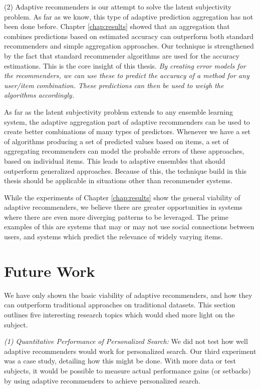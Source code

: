 (2) Adaptive recommenders is our attempt to solve the latent subjectivity problem.
As far as we know, this type of adaptive prediction aggregation has not been done before.
Chapter \ref{chap:results} showed that an aggregation that combines predictions based
on estimated accuracy can outperform both standard recommenders and simple aggregation approaches.
Our technique is strengthened by the fact that standard recommender algorithms
are used for the accuracy estimations.
This is the core insight of this thesis. 
\emph{By creating error models for the recommenders, we can use these to predict 
the accuracy of a method for any user/item combination.
These predictions can then be used to weigh the algorithms accordingly.}

As far as the latent subjectivity problem extends to any ensemble learning system,
the adaptive aggregation part of adaptive recommenders can be used to 
create better combinations of many types of predictors.
Whenever we have a set of algorithms producing a set of predicted values
based on items, a set of aggregating recommenders can model the probable
errors of these approaches, based on individual items.
This leads to adaptive ensembles that should outperform generalized approaches.
Because of this, the technique build in this thesis should be 
applicable in situations other than recommender systems.

While the experiments of Chapter \ref{chap:results} show the general viability of adaptive recommenders,
we believe there are greater opportunities in systems where there  are even more diverging
patterns to be leveraged. The prime examples of this are systems that may or may 
not use social connections between users, and systems which predict the 
relevance of widely varying items.


\section{Future Work}      

We have only shown the basic viability of adaptive recommenders,
and how they can outperform traditional approaches on traditional datasets.
This section outlines five interesting research topics
which would shed more light on the subject.


\emph{(1) Quantitative Performance of Personalized Search:}
We did not test how well adaptive recommenders would work for personalized search.
Our third experiment was a case study, detailing how this might be done.
With more data or test subjects, it would be possible to measure
actual performance gains (or setbacks) by using adaptive recommenders to
achieve personalized search.

